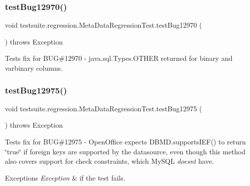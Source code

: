 \subsubsection{\texorpdfstring{test\+Bug12970()}{testBug12970()}}
{\footnotesize\ttfamily void testsuite.\+regression.\+Meta\+Data\+Regression\+Test.\+test\+Bug12970 (\begin{DoxyParamCaption}{ }\end{DoxyParamCaption}) throws Exception}

Tests fix for B\+UG\#12970 -\/ java.\+sql.\+Types.\+O\+T\+H\+ER returned for binary and varbinary columns. \mbox{\label{classtestsuite_1_1regression_1_1_meta_data_regression_test_ad4507d03539b3dcb6640da83424031e7}} 
\subsubsection{\texorpdfstring{test\+Bug12975()}{testBug12975()}}
{\footnotesize\ttfamily void testsuite.\+regression.\+Meta\+Data\+Regression\+Test.\+test\+Bug12975 (\begin{DoxyParamCaption}{ }\end{DoxyParamCaption}) throws Exception}

Tests fix for B\+UG\#12975 -\/ Open\+Office expects D\+B\+M\+D.\+supports\+I\+E\+F() to return \char`\"{}true\char`\"{} if foreign keys are supported by the datasource, even though this method also covers support for check constraints, which My\+S\+QL {\itshape doesn\textquotesingle{}t} have.


\begin{DoxyExceptions}{Exceptions}
{\em Exception} & if the test fails. \\
\hline
\end{DoxyExceptions}
\mbox{\label{classtestsuite_1_1regression_1_1_meta_data_regression_test_a0c675c284ad20892d31732b73f09e7c6}} 
